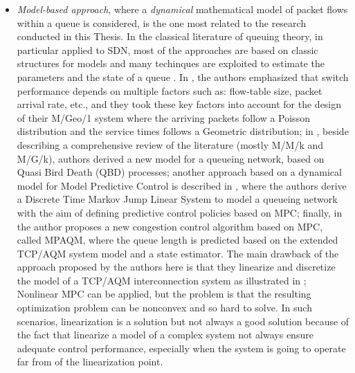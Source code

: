 \begin{itemize}
  \item \textit{Model-based approach}, where a \textit{dynamical} mathematical model of packet flows within a queue is considered, is the one most related to the research conducted in this Thesis. In the classical literature of queuing theory, in particular applied to SDN, most of the approaches are based on classic structures for models \cite{MDPSDNSURV} and many techinques are exploited to estimate the parameters and the state of a queue \cite{ParameterStateEst}. In \cite{Sood2016PerformanceAO}, the authors emphasized that switch performance depends on multiple factors such as: flow-table size, packet arrival rate, etc., and they took these key factors into account for the design of their M/Geo/1 system where the arriving packets follow a Poisson distribution and the service times follows a Geometric distribution; in \cite{SINGH201824}, beside describing a comprehensive review of the literature (mostly M/M/k and M/G/k), authors derived a new model for a queueing network, based on Quasi Bird Death (QBD) processes; another approach based on a dynamical model for Model Predictive Control is described in \cite{SchoffMPC}, where the authors derive a Discrete Time Markov Jump Linear System to model a queueing network with the aim of defining predictive control policies based on MPC; finally, in \cite{WANG2012120} the author proposes a new congestion control algorithm based on MPC, called MPAQM, where the queue length is predicted based on the extended TCP/AQM system model and a state estimator. The main drawback of the approach proposed by the authors here is that they linearize and discretize the model of a TCP/AQM interconnection system as illustrated in \cite{TCPSTATESPACE}; Nonlinear MPC can be applied, but the problem is that the resulting optimization problem can be nonconvex and so hard to solve. In such scenarios, linearization is a solution but not always a good solution because of the fact that linearize a model of a complex system not always ensure adequate control performance, especially when the system is going to operate far from of the linearization point.
%  
  \end{itemize}


